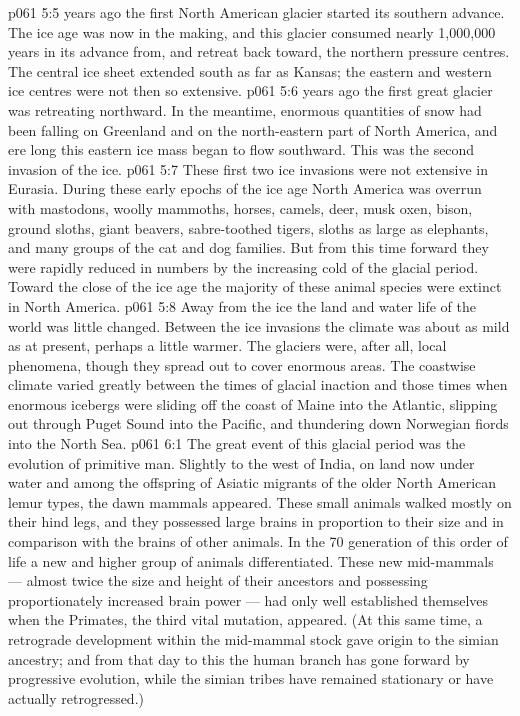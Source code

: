 \vs p061 5:5 \pc {} years ago the first North American glacier started its southern advance. The ice age was now in the making, and this glacier consumed nearly 1,000,000 years in its advance from, and retreat back toward, the northern pressure centres. The central ice sheet extended south as far as Kansas; the eastern and western ice centres were not then so extensive.
\vs p061 5:6 \pc {} years ago the first great glacier was retreating northward. In the meantime, enormous quantities of snow had been falling on Greenland and on the north\hyp{}eastern part of North America, and ere long this eastern ice mass began to flow southward. This was the second invasion of the ice.
\vs p061 5:7 These first two ice invasions were not extensive in Eurasia. During these early epochs of the ice age North America was overrun with mastodons, woolly mammoths, horses, camels, deer, musk oxen, bison, ground sloths, giant beavers, sabre\hyp{}toothed tigers, sloths as large as elephants, and many groups of the cat and dog families. But from this time forward they were rapidly reduced in numbers by the increasing cold of the glacial period. Toward the close of the ice age the majority of these animal species were extinct in North America.
\vs p061 5:8 Away from the ice the land and water life of the world was little changed. Between the ice invasions the climate was about as mild as at present, perhaps a little warmer. The glaciers were, after all, local phenomena, though they spread out to cover enormous areas. The coastwise climate varied greatly between the times of glacial inaction and those times when enormous icebergs were sliding off the coast of Maine into the Atlantic, slipping out through Puget Sound into the Pacific, and thundering down Norwegian fiords into the North Sea.
\vs p061 6:1 The great event of this glacial period was the evolution of primitive man. Slightly to the west of India, on land now under water and among the offspring of Asiatic migrants of the older North American lemur types, the dawn mammals  appeared. These small animals walked mostly on their hind legs, and they possessed large brains in proportion to their size and in comparison with the brains of other animals. In the 70 generation of this order of life a new and higher group of animals  differentiated. These new mid\hyp{}mammals --- almost twice the size and height of their ancestors and possessing proportionately increased brain power --- had only well established themselves when the Primates, the third vital mutation,  appeared. (At this same time, a retrograde development within the mid\hyp{}mammal stock gave origin to the simian ancestry; and from that day to this the human branch has gone forward by progressive evolution, while the simian tribes have remained stationary or have actually retrogressed.)
